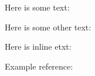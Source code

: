 \documentclass{article}
\begin{document}
Here is some text:

\exampleN



Here is some other text:

\exampleTwoN

Here is inline etxt: \exampleT

Example reference: \cite{JFP:ooAgda}




\end{document}
